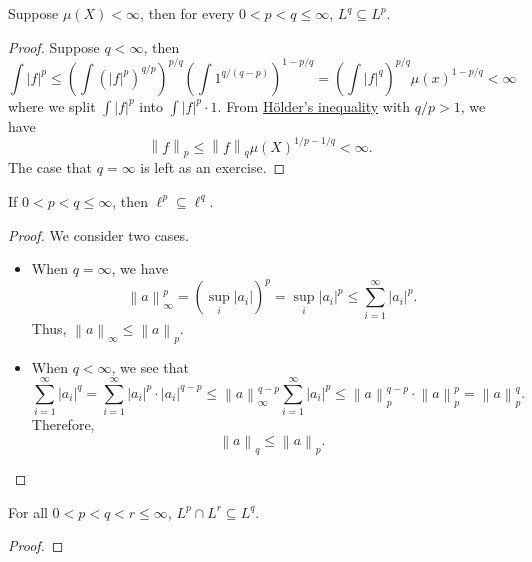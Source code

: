 \begin{proposition}
	Suppose \(\mu (X)<\infty \), then for every \(0<p<q\leq \infty \), \(L^q\subseteq L^p\).
\end{proposition}
\begin{proof}
	Suppose \(q<\infty \), then
	\[
		\int \left\vert f \right\vert ^p \leq \left(\int \left(\left\vert f \right\vert ^p\right)^{q / p}\right)^{p / q}\left(\int 1^{q/(q-p)}\right)^{1 - p / q}
		= \left(\int \left\vert f \right\vert ^q\right)^{p / q}\mu (x)^{1 - p / q}< \infty
	\]
	where we split \(\int \left\vert f \right\vert ^p\) into \(\int \left\vert f \right\vert ^p\cdot 1\). From \hyperref[thm:Holder-inequality]{Hölder's inequality}
	with \(q / p > 1\), we have
	\[
		\left\lVert f\right\rVert _p \leq \left\lVert f\right\rVert _q \mu (X)^{1 / p - 1 / q}< \infty .
	\]
	The case that \(q = \infty \) is left as an exercise.
\end{proof}

\begin{proposition}
	If \(0<p<q\leq \infty \), then \(\ell ^p\subseteq \ell ^q\).
\end{proposition}
\begin{proof}
	We consider two cases.
	\begin{itemize}
		\item When \(q = \infty \), we have
		      \[
			      \left\lVert a\right\rVert ^p_\infty = \left(\sup _i \left\vert a_{i}  \right\vert \right)^p = \sup _i \left\vert a_{i}  \right\vert ^p \leq \sum_{i=1}^{\infty} \left\vert a_{i}  \right\vert ^p.
		      \]
		      Thus, \(\left\lVert a\right\rVert _\infty \leq \left\lVert a\right\rVert _p\).
		\item When \(q<\infty \), we see that
		      \[
			      \sum_{i=1}^{\infty}\left\vert a_{i}  \right\vert  ^q
			      = \sum_{i=1}^{\infty} \left\vert a_{i}  \right\vert ^p \cdot \left\vert a_{i}  \right\vert ^{q - p}
			      \leq \left\lVert a\right\rVert _\infty ^{q-p}\sum_{i=1}^{\infty} \left\vert a_{i}  \right\vert ^p
			      \leq \left\lVert a\right\rVert _p^{q-p} \cdot \left\lVert a\right\rVert _p^p = \left\lVert a\right\rVert ^q_p.
		      \]
		      Therefore,
		      \[
			      \left\lVert a\right\rVert _q\leq \left\lVert a\right\rVert _p.
		      \]
	\end{itemize}
\end{proof}

\begin{proposition}
	For all \(0<p<q<r\leq \infty \), \(L^p \cap L^{r} \subseteq L^q \).
\end{proposition}
\begin{proof}
\end{proof}

